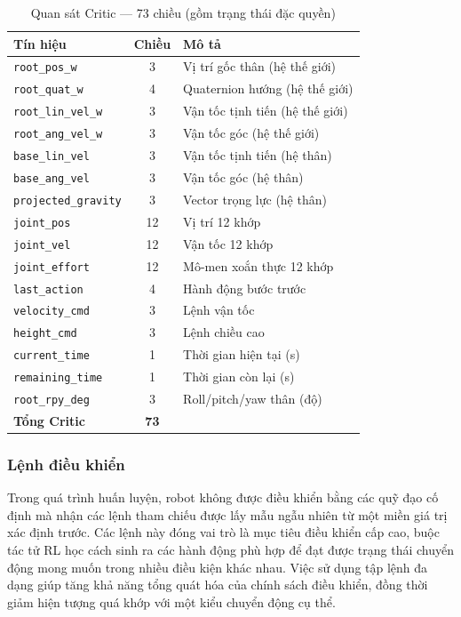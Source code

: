 \begin{table}[H]
    \centering
    \caption{Quan sát Critic — 73 chiều (gồm trạng thái đặc quyền)}
    \label{tab:obs_critic_extra}
    \renewcommand{\arraystretch}{1.3}
    \begin{tabular}{|l|c|l|}
    \hline
    \textbf{Tín hiệu} & \textbf{Chiều} & \textbf{Mô tả} \\
    \hline
    \texttt{root\_pos\_w}        & 3  & Vị trí gốc thân (hệ thế giới) \\
    \texttt{root\_quat\_w}       & 4  & Quaternion hướng (hệ thế giới) \\
    \texttt{root\_lin\_vel\_w}   & 3  & Vận tốc tịnh tiến (hệ thế giới) \\
    \texttt{root\_ang\_vel\_w}   & 3  & Vận tốc góc (hệ thế giới) \\
    \texttt{base\_lin\_vel}      & 3  & Vận tốc tịnh tiến (hệ thân) \\
    \texttt{base\_ang\_vel}      & 3  & Vận tốc góc (hệ thân) \\
    \texttt{projected\_gravity}  & 3  & Vector trọng lực (hệ thân) \\
    \texttt{joint\_pos}          & 12 & Vị trí 12 khớp \\
    \texttt{joint\_vel}          & 12 & Vận tốc 12 khớp \\
    \texttt{joint\_effort}       & 12 & Mô-men xoắn thực 12 khớp \\
    \texttt{last\_action}        & 4  & Hành động bước trước \\
    \texttt{velocity\_cmd}       & 3  & Lệnh vận tốc \\
    \texttt{height\_cmd}         & 3  & Lệnh chiều cao \\
    \texttt{current\_time}       & 1  & Thời gian hiện tại (s) \\
    \texttt{remaining\_time}     & 1  & Thời gian còn lại (s) \\
    \texttt{root\_rpy\_deg}      & 3  & Roll/pitch/yaw thân (độ) \\
    \hline
    \textbf{Tổng Critic}         & \textbf{73} & \\
    \hline
    \end{tabular}
\end{table}

\subsubsection{Lệnh điều khiển}

Trong quá trình huấn luyện, robot không được điều khiển bằng các quỹ đạo cố định mà nhận các lệnh tham chiếu được lấy mẫu ngẫu nhiên từ một miền giá trị xác định trước. Các lệnh này đóng vai trò là mục tiêu điều khiển cấp cao, buộc tác tử RL học cách sinh ra các hành động phù hợp để đạt được trạng thái chuyển động mong muốn trong nhiều điều kiện khác nhau. Việc sử dụng tập lệnh đa dạng giúp tăng khả năng tổng quát hóa của chính sách điều khiển, đồng thời giảm hiện tượng quá khớp với một kiểu chuyển động cụ thể.

